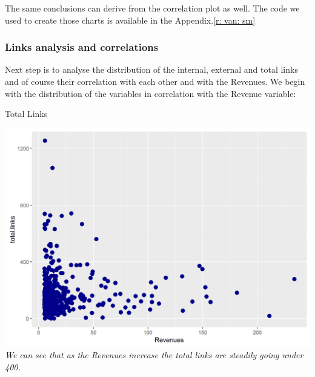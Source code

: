\documentclass{book}
\begin{document}
The same conclusions can derive from the correlation plot as well. The code we used to create those charts is available in the Appendix.\ref{r: van: sm}
\subsubsection{Links analysis and correlations}
Next step is to analyse the distribution of the internal, external and total links and of course their correlation with each other and with the Revenues. We begin with the distribution of the variables in correlation with the Revenue variable:

\begin{table}[H]
\centering
\caption{Total Links}
\begin{center}
\includegraphics[scale=0.5]{../R/photos/24_totlinks_rev.png}  \\
\textit{We can see that as the Revenues increase the total links are steadily going under 400.}
\end{center}
\end{table}
\end{document}
